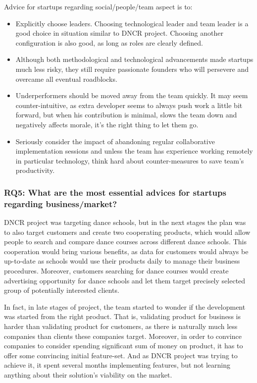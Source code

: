 \documentclass{article}
\begin{document}
Advice for startups regarding social/people/team aspect is to:
\begin{itemize}
\item Explicitly choose leaders. Choosing technological leader and team leader is a good choice in situation similar to DNCR project. Choosing another configuration is also good, as long as roles are clearly defined.
\item Although both methodological and technological advancements made startups much less risky, they still require passionate founders who will persevere and overcame all eventual roadblocks.
\item Underperformers should be moved away from the team quickly. It may seem counter-intuitive, as extra developer seems to always push work a little bit forward, but when his contribution is minimal, slows the team down and negatively affects morale, it's the right thing to let them go.
\item Seriously consider the impact of abandoning regular collaborative implementation sessions and unless the team has experience working remotely in particular technology, think hard about counter-measures to save team's productivity.
\end{itemize}

\subsubsection{RQ5: What are the most essential advices for startups regarding business/market?}
DNCR project was targeting dance schools, but in the next stages the plan was to also target customers and create two cooperating products, which would allow people to search and compare dance courses across different dance schools. This cooperation would bring various benefits, as data for customers would always be up-to-date as schools would use their products daily to manage their business procedures. Moreover, customers searching for dance courses would create advertising opportunity for dance schools and let them target precisely selected group of potentially interested clients.

In fact, in late stages of project, the team started to wonder if the development was started from the right product. That is, validating product for business is harder than validating product for customers, as there is naturally much less companies than clients these companies target. Moreover, in order to convince companies to consider spending significant sum of money on product, it has to offer some convincing initial feature-set. And as DNCR project was trying to achieve it, it spent several months implementing features, but not learning anything about their solution's viability on the market.
\end{document}
